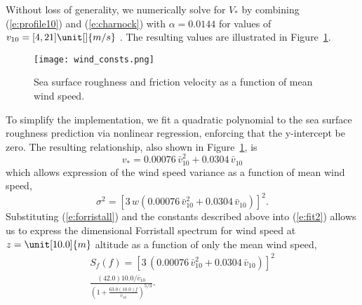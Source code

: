 \documentclass[utf8]{frontiersSCNS} %
\begin{document}
Without loss of generality, we numerically solve for $V_{*}$ by combining (\ref{e:profile10}) and (\ref{e:charnock}) with $\alpha= 0.0144$ for values of $v_{10} = [4, 21]\unit[]{m/s}$ \citep{garratt77review}.  The resulting values are illustrated in Figure~\ref{f:wind_consts}.
\begin{figure}[hbt!]
  \centering
  \texttt{[image: wind\_consts.png]}
  \caption{Sea surface roughness and friction velocity as a function of mean wind speed.}
  \label{f:wind_consts}
\end{figure}
To simplify the implementation, we fit a quadratic polynomial to the sea surface roughness prediction via nonlinear regression, enforcing that the y-intercept be zero.  The resulting relationship, also shown in Figure~\ref{f:wind_consts}, is
\begin{equation}
v_* = 0.00076 \, \bar{v}_{10}^2 + 0.0304 \, \bar{v}_{10}
\label{e:fit}
\end{equation}
which allows expression of the wind speed variance as a function of mean wind speed,
\begin{equation}
\sigma^2 = \left[ 3 \, w (0.00076 \, \bar{v}_{10}^2 + 0.0304 \, \bar{v}_{10})\right]^2.
\label{e:fit2}
\end{equation}
Substituting (\ref{e:forristall}) and the constants described above into (\ref{e:fit2})  allows us to express the dimensional Forristall spectrum for wind speed at $z=\unit[10.0]{m}$ altitude as a function of only the mean wind speed,
\begin{multline}
S_f(f) =  \left[ 3 \, (0.00076 \, \bar{v}_{10}^2 + 0.0304 \, \bar{v}_{10})\right]^2 \\
\frac{(42.0)10.0/\bar{v}_{10}}{\left(1+\frac{63.0 (10.0) f}{\bar{v}_{10}}\right)^{5/3}}.
\label{e:dimensional}
\end{multline}

\vspace{3em}
\end{document}
